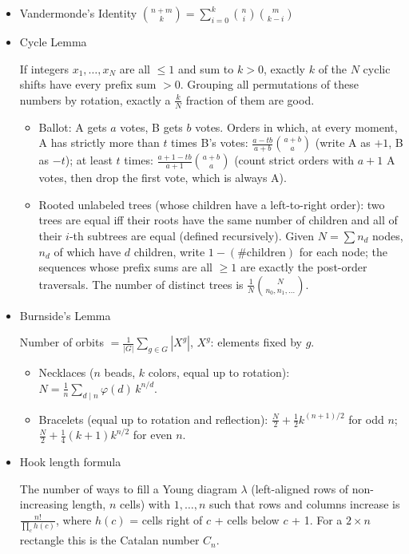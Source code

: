\begin{itemize}
\item Vandermonde's Identity $\binom{n+m}{k} = \sum_{i=0}^{k} \binom{n}{i}\binom{m}{k-i}$

\item Cycle Lemma

If integers $x_1, \ldots, x_N$ are all $\le 1$ and sum to $k > 0$, exactly $k$ of the $N$ cyclic shifts have every prefix sum $> 0$. Grouping all permutations of these numbers by rotation, exactly a $\frac{k}{N}$ fraction of them are good.
\begin{itemize}
  \item Ballot: A gets $a$ votes, B gets $b$ votes. Orders in which, at every moment, A has strictly more than $t$ times B's votes: $\frac{a - tb}{a + b}\binom{a + b}{a}$ (write A as $+1$, B as $-t$); at least $t$ times: $\frac{a + 1 - tb}{a + 1}\binom{a + b}{a}$ (count strict orders with $a + 1$ A votes, then drop the first vote, which is always A).
  \item Rooted unlabeled trees (whose children have a left-to-right order): two trees are equal iff their roots have the same number of children and all of their $i$-th subtrees are equal (defined recursively). Given $N = \sum n_d$ nodes, $n_d$ of which have $d$ children, write $1 - (\#\text{children})$ for each node; the sequences whose prefix sums are all $\ge 1$ are exactly the post-order traversals. The number of distinct trees is $\frac{1}{N}\binom{N}{n_0, n_1, \ldots}$.
\end{itemize}

\item Burnside's Lemma

Number of orbits $= \frac{1}{|G|} \sum_{g \in G} |X^g|$, $X^g$: elements fixed by $g$.
\begin{itemize}
  \item Necklaces ($n$ beads, $k$ colors, equal up to rotation): $N = \frac 1 n \sum_{d \mid n} \varphi(d)\, k^{n/d}$.
  \item Bracelets (equal up to rotation and reflection): $\frac N 2 + \frac 1 2 k^{(n+1)/2}$ for odd $n$; $\frac N 2 + \frac 1 4 (k+1) k^{n/2}$ for even $n$.
\end{itemize}

\item Hook length formula

The number of ways to fill a Young diagram $\lambda$ (left-aligned rows of non-increasing length, $n$ cells) with $1, \ldots, n$ such that rows and columns increase is $\frac{n!}{\prod_{c} h(c)}$, where $h(c)$ = cells right of $c$ + cells below $c$ + 1. For a $2 \times n$ rectangle this is the Catalan number $C_n$.


\end{itemize}
